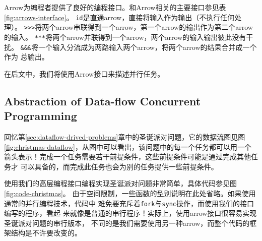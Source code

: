 \documentclass[conference]{IEEEtran}
\begin{document}
Arrow为编程者提供了良好的编程接口。和Arrow相关的主要接口参见表\ref{fig:arrows-interface}。
\texttt{id}是直通arrow，直接将输入作为输出（不执行任何处理）。
\texttt{>>>}将两个arrow串联得到一个arrow，第一个arrow的输出作为第二个arrow的输入。
\texttt{***}将两个arrow并联得到一个arrow，两个arrow的输入输出彼此没有干扰。
\texttt{\&\&\&}将一个输入分流成为两路输入两个arrow，将两个arrow的结果合并成一个作为
总输出。

在后文中，我们将使用Arrow接口来描述并行任务。

\subsection{Abstraction of Data-flow Concurrent Programming}\label{subsec:abstraction-of-dataflow}
回忆第\ref{sec:dataflow-drived-problems}章中的圣诞派对问题，它的数据流图见图
\ref{fig:christmas-dataflow}，从图中可以看出，该问题中的每一个任务都可以用一个
箭头表示！完成一个任务需要若干前提条件，这些前提条件可能是通过完成其他任务才
可以具备的，而完成此任务也会为别的任务提供一些前提条件。

使用我们的高层编程接口编程实现圣诞派对问题非常简单，具体代码参见图\ref{fig:code-christmas}。
由于空间限制，一些函数的型别说明在此处省略。如果使用通常的并行编程技术，代码中
难免要充斥着\texttt{fork}与\texttt{sync}操作，而使用我们的接口编写的程序，看起
来就像是普通的串行程序！实际上，使用arrow接口很容易实现圣诞派对问题的串行版本，
不同的是我们需要使用另一种arrow，而整个代码的框架结构是不许要改变的。
\end{document}
